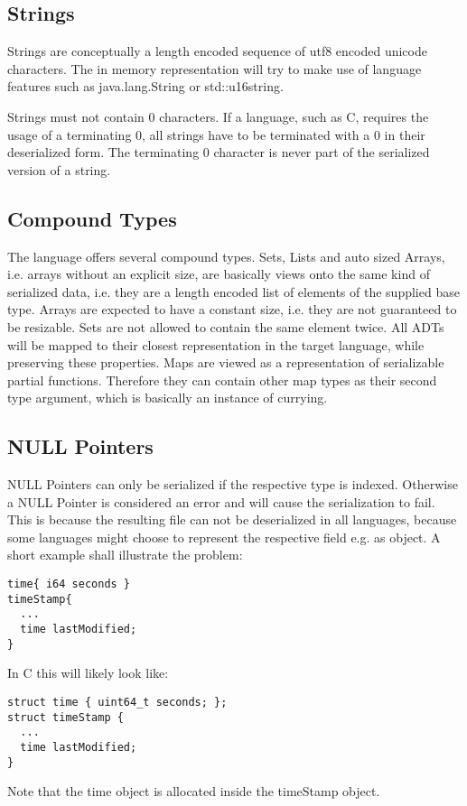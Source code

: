 \documentclass[a4paper,10pt]{article}
\begin{document}
\subsection*{Strings}

Strings are conceptually a length encoded sequence of utf8 encoded unicode characters. The in memory representation will try to make use of language features such as java.lang.String or std::u16string.

Strings must not contain 0 characters. If a language, such as C, requires the usage of a terminating 0, all strings have to be terminated with a 0 in their deserialized form. The terminating 0 character is never part of the serialized version of a string.

\subsection*{Compound Types}

The language offers several compound types. Sets, Lists and auto sized Arrays, i.e. arrays without an explicit size, are basically views onto the same kind of serialized data, i.e. they are a length encoded list of elements of the supplied base type. Arrays are expected to have a constant size, i.e. they are not guaranteed to be resizable. Sets are not allowed to contain the same element twice.
All ADTs will be mapped to their closest representation in the target language, while preserving these properties.
Maps are viewed as a representation of serializable partial functions. Therefore they can contain other map types as their second type argument, which is basically an instance of currying.

\subsection*{NULL Pointers}

NULL Pointers can only be serialized if the respective type is indexed. Otherwise a NULL Pointer is considered an error and will cause the serialization to fail. This is because the resulting file can not be deserialized in all languages, because some languages might choose to represent the respective field e.g. as object. A short example shall illustrate the problem:
\begin{verbatim}
time{ i64 seconds }
timeStamp{
  ...
  time lastModified;
}
\end{verbatim}

In C this will likely look like:
\begin{verbatim}
struct time { uint64_t seconds; };
struct timeStamp {
  ...
  time lastModified;
}
\end{verbatim}
Note that the time object is allocated inside the timeStamp object.
\end{document}
